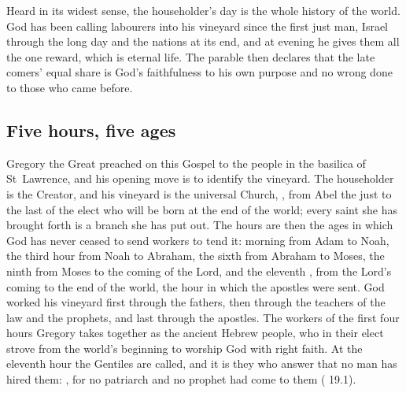 \label{sec:one-wage-across-the-ages}

Heard in its widest sense, the householder's day is the whole history of the
world. God has been calling labourers into his vineyard since the first just
man, Israel through the long day and the nations at its end, and at evening he
gives them all the one reward, which is eternal life. The parable then declares
that the late comers' equal share is God's faithfulness to his own purpose and
no wrong done to those who came before.

\subsection{Five hours, five ages}

Gregory the Great preached on this Gospel to the people in the basilica of
St~Lawrence, and his opening move is to identify the vineyard. The householder is the Creator, and
his vineyard is the universal Church, , from Abel the just to the last of the elect who will be born at the
end of the world; every saint she has brought forth is a branch she has put
out. The hours are then the ages in which God has never ceased to send
workers to tend it: morning from Adam to Noah, the third hour from Noah to
Abraham, the sixth from Abraham to Moses, the ninth from Moses to the coming of
the Lord, and the eleventh , from
the Lord's coming to the end of the world, the hour in which the apostles were
sent. God worked his vineyard first through the fathers, then through the
teachers of the law and the prophets, and last through the apostles. The
workers of the first four hours Gregory takes together as the ancient Hebrew
people, who in their elect strove from the world's beginning to worship God
with right faith. At the eleventh hour the Gentiles are called, and it is they
who answer that no man has hired them: , for no patriarch and no prophet had come to them
( 19.1).

